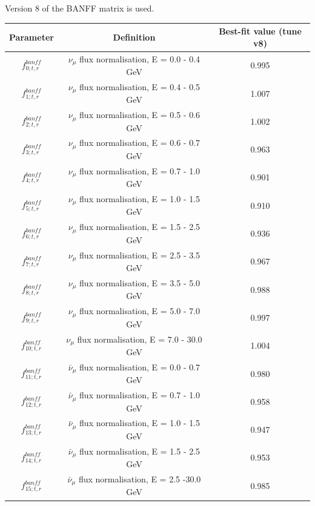 Version 8 of the BANFF matrix is used.

{
\renewcommand{\arraystretch}{1.5}
\begin{table}
\centering
\begin{tabular}{| c | c | c |}
\hline
 Parameter               &  Definition                                                &  Best-fit value (tune v8) \\
\hline
 $f_{0; t, r}^{banff}$   &  $\nu_\mu$ flux normalisation, E = 0.0 - 0.4 GeV           & 0.995 \\
 $f_{1; t, r}^{banff}$   &  $\nu_\mu$ flux normalisation, E = 0.4 - 0.5 GeV           & 1.007 \\
 $f_{2; t, r}^{banff}$   &  $\nu_\mu$ flux normalisation, E = 0.5 - 0.6 GeV           & 1.002 \\
 $f_{3; t, r}^{banff}$   &  $\nu_\mu$ flux normalisation, E = 0.6 - 0.7 GeV           & 0.963 \\
 $f_{4; t, r}^{banff}$   &  $\nu_\mu$ flux normalisation, E = 0.7 - 1.0 GeV           & 0.901 \\
 $f_{5; t, r}^{banff}$   &  $\nu_\mu$ flux normalisation, E = 1.0 - 1.5 GeV           & 0.910 \\
 $f_{6; t, r}^{banff}$   &  $\nu_\mu$ flux normalisation, E = 1.5 - 2.5 GeV           & 0.936 \\
 $f_{7; t, r}^{banff}$   &  $\nu_\mu$ flux normalisation, E = 2.5 - 3.5 GeV           & 0.967 \\
 $f_{8; t, r}^{banff}$   &  $\nu_\mu$ flux normalisation, E = 3.5 - 5.0 GeV           & 0.988 \\
 $f_{9; t, r}^{banff}$  &  $\nu_\mu$ flux normalisation, E = 5.0 - 7.0 GeV            & 0.997 \\
 $f_{10; t, r}^{banff}$  &  $\nu_\mu$ flux normalisation, E = 7.0 - 30.0 GeV          & 1.004 \\
\hline
 $f_{11; t, r}^{banff}$  &  $\bar{\nu}_{\mu}$ flux normalisation, E = 0.0 - 0.7 GeV     & 0.980 \\
 $f_{12; t, r}^{banff}$  &  $\bar{\nu}_{\mu}$ flux normalisation, E = 0.7 - 1.0 GeV     & 0.958 \\
 $f_{13; t, r}^{banff}$  &  $\bar{\nu}_{\mu}$ flux normalisation, E = 1.0 - 1.5 GeV     & 0.947 \\
 $f_{14; t, r}^{banff}$  &  $\bar{\nu}_{\mu}$ flux normalisation, E = 1.5 - 2.5 GeV     & 0.953 \\
 $f_{15; t, r}^{banff}$  &  $\bar{\nu}_{\mu}$ flux normalisation, E = 2.5 -30.0 GeV     & 0.985 \\

\end{tabular}
\end{table}}
